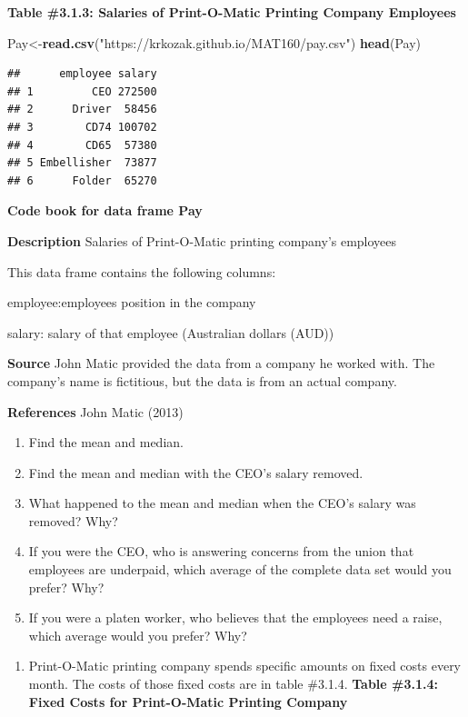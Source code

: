 \documentclass[]{book}
\newenvironment{Shaded}{\begin{snugshade}}{\end{snugshade}}
\newcommand{\KeywordTok}[1]{\textcolor[rgb]{0.13,0.29,0.53}{\textbf{#1}}}
\newcommand{\NormalTok}[1]{#1}
\newcommand{\StringTok}[1]{\textcolor[rgb]{0.31,0.60,0.02}{#1}}
\providecommand{\tightlist}{%
  \setlength{\itemsep}{0pt}\setlength{\parskip}{0pt}}
\begin{document}
\textbf{Table \#3.1.3: Salaries of Print-O-Matic Printing Company Employees}

\begin{Shaded}
\begin{Highlighting}[]
\NormalTok{Pay<-}\KeywordTok{read.csv}\NormalTok{(}\StringTok{"https://krkozak.github.io/MAT160/pay.csv"}\NormalTok{)}
\KeywordTok{head}\NormalTok{(Pay)}
\end{Highlighting}
\end{Shaded}

\begin{verbatim}
##      employee salary
## 1         CEO 272500
## 2      Driver  58456
## 3        CD74 100702
## 4        CD65  57380
## 5 Embellisher  73877
## 6      Folder  65270
\end{verbatim}

\textbf{Code book for data frame Pay}

\textbf{Description}
Salaries of Print-O-Matic printing company's employees

This data frame contains the following columns:

employee:employees position in the company

salary: salary of that employee (Australian dollars (AUD))

\textbf{Source}
John Matic provided the data from a company he worked with. The company's name is fictitious, but the data is from an actual company.

\textbf{References}
John Matic (2013)

\begin{enumerate}
\def\labelenumi{\alph{enumi}.}
\item
  Find the mean and median.
\item
  Find the mean and median with the CEO's salary removed.
\item
  What happened to the mean and median when the CEO's salary was removed? Why?
\item
  If you were the CEO, who is answering concerns from the union that employees are underpaid, which average of the complete data set would you prefer? Why?
\item
  If you were a platen worker, who believes that the employees need a raise, which average would you prefer? Why?
\end{enumerate}

\begin{enumerate}
\def\labelenumi{\arabic{enumi}.}
\setcounter{enumi}{3}
\tightlist
\item
  Print-O-Matic printing company spends specific amounts on fixed costs every month. The costs of those fixed costs are in table \#3.1.4.
  \textbf{Table \#3.1.4: Fixed Costs for Print-O-Matic Printing Company}
\end{enumerate}
\end{document}
